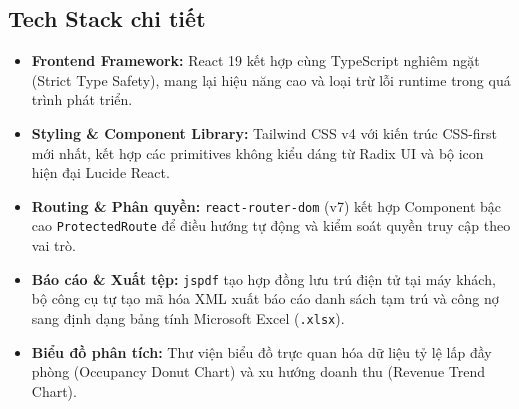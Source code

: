 \subsection{Tech Stack chi tiết}
\begin{itemize}
    \item \textbf{Frontend Framework:} React 19 kết hợp cùng TypeScript nghiêm ngặt (Strict Type Safety), mang lại hiệu năng cao và loại trừ lỗi runtime trong quá trình phát triển.
    \item \textbf{Styling \& Component Library:} Tailwind CSS v4 với kiến trúc CSS-first mới nhất, kết hợp các primitives không kiểu dáng từ Radix UI và bộ icon hiện đại Lucide React.
    \item \textbf{Routing \& Phân quyền:} \texttt{react-router-dom} (v7) kết hợp Component bậc cao \texttt{ProtectedRoute} để điều hướng tự động và kiểm soát quyền truy cập theo vai trò.
    \item \textbf{Báo cáo \& Xuất tệp:} \texttt{jspdf} tạo hợp đồng lưu trú điện tử tại máy khách, bộ công cụ tự tạo mã hóa XML xuất báo cáo danh sách tạm trú và công nợ sang định dạng bảng tính Microsoft Excel (\texttt{.xlsx}).
    \item \textbf{Biểu đồ phân tích:} Thư viện biểu đồ trực quan hóa dữ liệu tỷ lệ lấp đầy phòng (Occupancy Donut Chart) và xu hướng doanh thu (Revenue Trend Chart).
\end{itemize}

